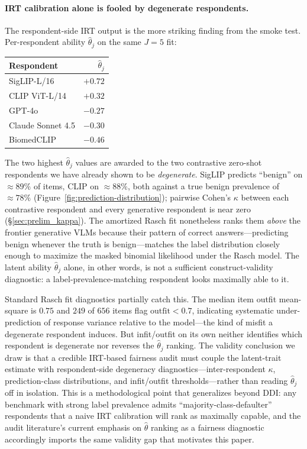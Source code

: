 \documentclass{article}
\begin{document}
\paragraph{IRT calibration alone is fooled by degenerate respondents.}
\label{sec:prelim_irt_degeneracy}
The respondent-side IRT output is the more striking finding from the smoke test. Per-respondent ability $\hat\theta_j$ on the same $J = 5$ fit:
\begin{center}
\small
\begin{tabular}{lr}
\toprule
Respondent & $\hat\theta_j$ \\
\midrule
SigLIP-L/16       & $+0.72$ \\
CLIP ViT-L/14     & $+0.32$ \\
GPT-4o            & $-0.27$ \\
Claude Sonnet 4.5 & $-0.30$ \\
BiomedCLIP        & $-0.46$ \\
\bottomrule
\end{tabular}
\end{center}
The two highest $\hat\theta_j$ values are awarded to the two contrastive zero-shot respondents we have already shown to be \emph{degenerate}. SigLIP predicts ``benign'' on $\approx 89\%$ of items, CLIP on $\approx 88\%$, both against a true benign prevalence of $\approx 78\%$ (Figure~\ref{fig:prediction-distribution}); pairwise Cohen's $\kappa$ between each contrastive respondent and every generative respondent is near zero (\S\ref{sec:prelim_kappa}). The amortized Rasch fit nonetheless ranks them \emph{above} the frontier generative VLMs because their pattern of correct answers---predicting benign whenever the truth is benign---matches the label distribution closely enough to maximize the masked binomial likelihood under the Rasch model. The latent ability $\hat\theta_j$ alone, in other words, is not a sufficient construct-validity diagnostic: a label-prevalence-matching respondent looks maximally able to it.

Standard Rasch fit diagnostics partially catch this. The median item outfit mean-square is $0.75$ and $249$ of $656$ items flag $\text{outfit} < 0.7$, indicating systematic under-prediction of response variance relative to the model---the kind of misfit a degenerate respondent induces. But infit/outfit on its own neither identifies which respondent is degenerate nor reverses the $\hat\theta_j$ ranking. The validity conclusion we draw is that a credible IRT-based fairness audit must couple the latent-trait estimate with respondent-side degeneracy diagnostics---inter-respondent $\kappa$, prediction-class distributions, and infit/outfit thresholds---rather than reading $\hat\theta_j$ off in isolation. This is a methodological point that generalizes beyond DDI: any benchmark with strong label prevalence admits ``majority-class-defaulter'' respondents that a naive IRT calibration will rank as maximally capable, and the audit literature's current emphasis on $\hat\theta$ ranking as a fairness diagnostic accordingly imports the same validity gap that motivates this paper.
\end{document}
